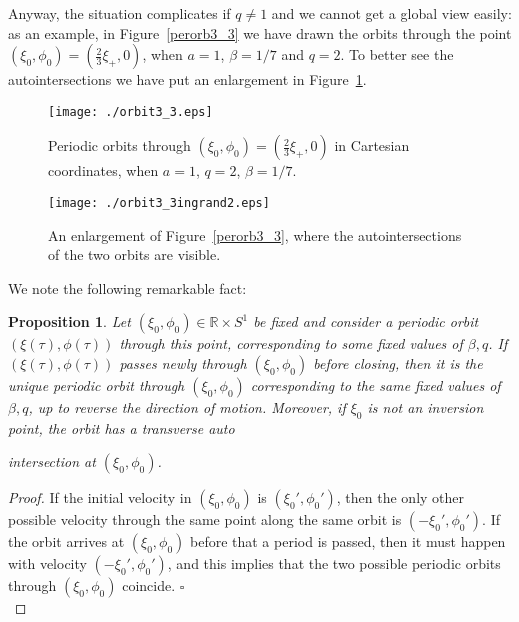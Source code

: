 \documentclass[a4paper]{article}
\newtheorem{proposition}{Proposition}
\begin{document}
Anyway, the situation complicates if $q \neq 1$ and we cannot get a global 
view easily: as an example, in  Figure~\ref{perorb3_3} we have drawn the 
orbits through the point $(\xi_0,\phi_0)=(\frac{2}{3} \xi_+,0)$, when $a=1$,
$\beta=1/7$ and $q = 2$.
To better see the autointersections we have put an enlargement in  
Figure~\ref{perorb3_3ingrand}.
\begin{figure}[h]
 \begin{minipage}[b]{0.49\textwidth}
   \centering
   
   \texttt{[image: ./orbit3\_3.eps]}
   \caption{\small{Periodic orbits through 
       $(\xi_0,\phi_0)=(\frac{2}{3} \xi_+,0)$ in Cartesian coordinates, 
       when $a=1$, $q=2$, $\beta=1/7$. }}
   \label{perorb3_3}
 \end{minipage}
 \hspace{2mm} 
 \begin{minipage}[b]{0.49\textwidth}
  \centering
   
  \texttt{[image: ./orbit3\_3ingrand2.eps]}
   \caption{\small{An enlargement of Figure~\ref{perorb3_3}, where the 
       autointersections of the two orbits are visible.}}
   \vspace{0.06cm}
   \label{perorb3_3ingrand}
 \end{minipage}
\end{figure}

 
We note the following remarkable fact:
\begin{proposition}
\label{ellip_early_coll}
Let $(\xi_0,\phi_0) \in {\mathbb{R}} \times S^1$ be fixed and consider a
periodic orbit $(\xi(\tau),\phi(\tau))$ through this point,
corresponding to some fixed values of $\beta,q$.  If
$(\xi(\tau),\phi(\tau))$ passes newly through $(\xi_0,\phi_0)$ before
closing, then it is the unique periodic orbit through $(\xi_0,\phi_0)$
corresponding to the same fixed values of $\beta, q$, up to reverse
the direction of motion. Moreover, if $\xi_0$ is not an inversion
point, the orbit has a transverse auto\newtheorem{Theorem}{Theorem}intersection at
$(\xi_0,\phi_0)$.
\end{proposition}
\begin{proof}
If the initial velocity in $(\xi_0,\phi_0)$ is $(\xi_0',\phi_0')$,
then the only other possible velocity through the same point along the
same orbit is $(-\xi_0',\phi_0')$.  If the orbit arrives at
$(\xi_0,\phi_0)$ before that a period is passed, then it must happen
with velocity $(-\xi_0',\phi_0')$, and this implies that the two
possible periodic orbits through $(\xi_0,\phi_0)$ coincide.  {$\square$\\}
\end{proof}
\end{document}
